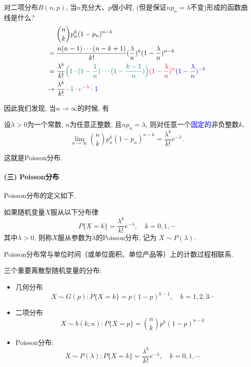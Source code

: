 对二项分布$B(n,p)$, 当$n$充分大、$p$很小时, (但是保证$np_n=\lambda$不变)形成的函数曲线是什么?
\begin{align*}
                   & {n \choose k}p_n^k(1-p_n)^{n-k}                                                                                                                                                    \\
    ={}            & \frac{n(n-1)\cdots (n-k+1)}{k!}(\frac{\lambda}{n})^k(1-\frac{\lambda}{n})^{n-k}                                                                                                    \\
    ={}            & \frac{\lambda^k}{k!}\textcolor{teal}{\Big(1\cdot (1-\frac{1}{n})\cdots (1-\frac{k-1}{n})\Big)}\textcolor{red}{(1-\frac{\lambda}{n})^n}\textcolor{blue}{(1-\frac{\lambda}{n})^{-k}} \\
    \rightarrow {} & \frac{\lambda^k}{k!}\cdot \textcolor{teal}{1}\cdot \textcolor{red}{e^{-\lambda}}\cdot \textcolor{blue}{1}
\end{align*}

因此我们发现, 当$n\to\infty$的时候, 有
\begin{theorem}
    设$\lambda>0$为一个常数, $n$为任意正整数, 且$np_n=\lambda$, 则对任意一个\textcolor{blue}{固定的}非负整数$k$, 
    $$
        \lim_{n\rightarrow \infty}{n\choose k}p_n^k(1-p_n)^{n-k}=\frac{\lambda^k}{k!}e^{-\lambda}.
    $$
\end{theorem}
这就是Poisson分布.

\paragraph{(三) Poisson分布}

Poisson分布的定义如下.
\begin{definition}[Poisson分布]
    如果随机变量$X$服从以下分布律
    \[ P\{X=k\}=\frac{\lambda^k}{k!}e^{-\lambda},\quad k=0,1,\cdots \]
    其中$\lambda>0$, 则称$X$服从参数为$\lambda$的Poisson分布, 记为
    $X\sim P(\lambda).$
\end{definition}%
Poisson分布常与单位时间（或单位面积、单位产品等）上的计数过程相联系.

\begin{takeaway}
    三个重要离散型随机变量的分布:
    \begin{itemize}
        \item 几何分布$$X\sim G(p): P\{X=k\}=p(1-p)^{k-1}, \quad k=1,2,3 \cdots$$
        \item 二项分布$$X\sim b(k ; n): P\{X=p\}=\binom nk p^k(1-p)^{n-k}$$
        \item Poisson分布: $$X\sim P(\lambda): P\{X=k\}=\frac{\lambda^k}{k !} e^{-\lambda}, \quad k=0,1, \cdots$$
    \end{itemize}
\end{takeaway}